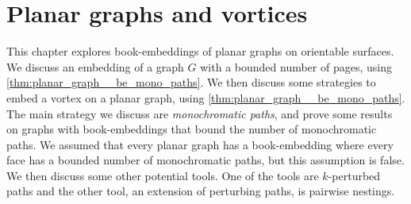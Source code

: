 \chapter{Planar graphs and vortices}\label{chap:planar}

This chapter explores book-embeddings of planar graphs on orientable surfaces. 
We discuss an embedding of a graph $G$ with a bounded number of pages, using \cref{thm:planar_graph__be_mono_paths}. We then discuss some strategies to embed a vortex on a planar graph, using \cref{thm:planar_graph__be_mono_paths}. The main strategy we discuss are \textit{monochromatic paths}, and prove some results on graphs with book-embeddings that bound the number of monochromatic paths. We assumed that every planar graph has a book-embedding where every face has a bounded number of monochromatic paths, but this assumption is false. We then discuss some other potential tools. One of the tools are $k$-perturbed paths and the other tool, an extension of perturbing paths, is pairwise nestings. 





